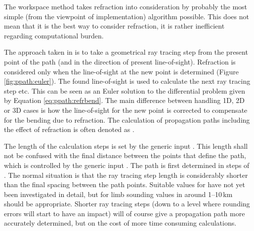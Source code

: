 The workspace method  takes
refraction into consideration by probably the most simple (from the
viewpoint of implementation) algorithm possible. This does not mean
that it is the best way to consider refraction, it is rather
inefficient regarding computational burden.

The approach taken in  is to
take a geometrical ray tracing step from the present point of the path
(and in the direction of present line-of-sight). Refraction is
considered only when the line-of-sight at the new point is determined
(Figure \ref{fig:ppath:euler}). The found line-of-sight is used to
calculate the next ray tracing step etc. This can be seen as an Euler
solution to the differential problem given by
Equation \ref{eq:ppath:refrbend}. The main difference between handling
1D, 2D or 3D cases is how the line-of-sight for the new point is
corrected to compensate for the bending due to refraction. The
calculation of propagation paths including the effect of refraction is
often denoted as .

The length of the calculation steps is set by the generic input
. This length shall not be confused with the
final distance between the points that define the path, which is
controlled by the generic input . The path is first
determined in steps of . The normal situation
is that the ray tracing step length is considerably shorter than the
final spacing between the path points. Suitable values for
 have not yet been investigated in detail, but
for limb sounding values in around 1--10\,km should be appropriate.
Shorter ray tracing steps (down to a level where rounding errors will
start to have an impact) will of course give a propagation path more
accurately determined, but on the cost of more time consuming
calculations.



